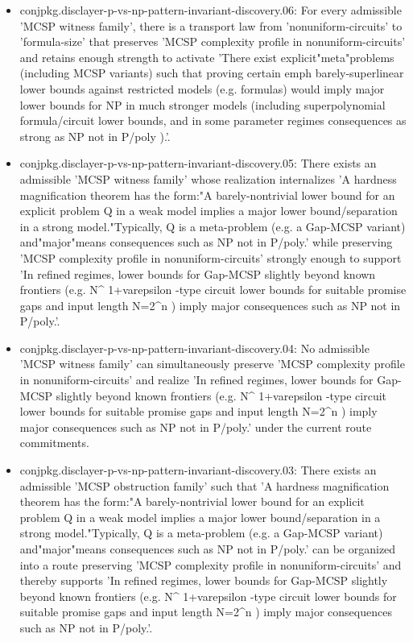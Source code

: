 \documentclass[11pt]{article}
\begin{document}
\begin{itemize}
\item conjpkg.disclayer-p-vs-np-pattern-invariant-discovery.06: For every admissible 'MCSP witness family', there is a transport law from 'nonuniform-circuits' to 'formula-size' that preserves 'MCSP complexity profile in nonuniform-circuits' and retains enough strength to activate 'There exist explicit"meta"problems (including MCSP variants) such that proving certain emph barely-superlinear lower bounds against restricted models (e.g. formulas) would imply major lower bounds for NP in much stronger models (including superpolynomial formula/circuit lower bounds, and in some parameter regimes consequences as strong as NP not in P/poly ).'.
\item conjpkg.disclayer-p-vs-np-pattern-invariant-discovery.05: There exists an admissible 'MCSP witness family' whose realization internalizes 'A hardness magnification theorem has the form:"A barely-nontrivial lower bound for an explicit problem Q in a weak model implies a major lower bound/separation in a strong model."Typically, Q is a meta-problem (e.g. a Gap-MCSP variant) and"major"means consequences such as NP not in P/poly.' while preserving 'MCSP complexity profile in nonuniform-circuits' strongly enough to support 'In refined regimes, lower bounds for Gap-MCSP slightly beyond known frontiers (e.g. N\textasciicircum{} 1+varepsilon -type circuit lower bounds for suitable promise gaps and input length N=2\textasciicircum{}n ) imply major consequences such as NP not in P/poly.'.
\item conjpkg.disclayer-p-vs-np-pattern-invariant-discovery.04: No admissible 'MCSP witness family' can simultaneously preserve 'MCSP complexity profile in nonuniform-circuits' and realize 'In refined regimes, lower bounds for Gap-MCSP slightly beyond known frontiers (e.g. N\textasciicircum{} 1+varepsilon -type circuit lower bounds for suitable promise gaps and input length N=2\textasciicircum{}n ) imply major consequences such as NP not in P/poly.' under the current route commitments.
\item conjpkg.disclayer-p-vs-np-pattern-invariant-discovery.03: There exists an admissible 'MCSP obstruction family' such that 'A hardness magnification theorem has the form:"A barely-nontrivial lower bound for an explicit problem Q in a weak model implies a major lower bound/separation in a strong model."Typically, Q is a meta-problem (e.g. a Gap-MCSP variant) and"major"means consequences such as NP not in P/poly.' can be organized into a route preserving 'MCSP complexity profile in nonuniform-circuits' and thereby supports 'In refined regimes, lower bounds for Gap-MCSP slightly beyond known frontiers (e.g. N\textasciicircum{} 1+varepsilon -type circuit lower bounds for suitable promise gaps and input length N=2\textasciicircum{}n ) imply major consequences such as NP not in P/poly.'.

\end{itemize}
\end{document}
